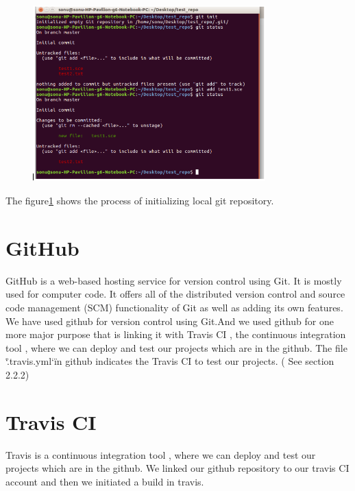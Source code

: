 \documentclass[12pt,a4paper]{report}
\begin{document}
\begin{figure}[H]
\centering
\includegraphics[width = 0.8\textwidth]{git.png}
\label{gitcommand}
\end{figure}


The figure\ref{gitcommand} shows the process of initializing local git repository.

\section{GitHub}

GitHub is a web-based hosting service for version control using Git.  It is mostly used for computer code. It offers all of the distributed version control and source code management (SCM) functionality of Git as well as adding its own features.\\

We have used github for version control using Git.And we used github for one more major purpose that is linking it with Travis CI , the continuous integration tool , where we can deploy and test our projects which are in the github. The file \char`\".travis.yml\char`\" in github indicates the Travis CI to test our projects. ( See section 2.2.2)\\


\section{Travis CI}
Travis is a continuous integration tool , where we can deploy and test our projects which are in the github. We linked our github repository to our travis CI account and then we initiated a build in travis.\\
\end{document}
